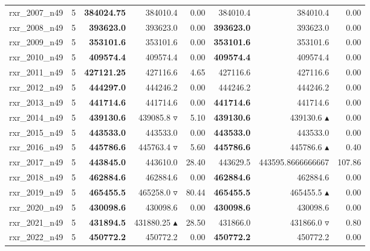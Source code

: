 \begin{table}[]
{\begin{tabular}{ll@{\hspace{1.2cm}}rrr@{\hspace{1.2cm}}rrr}
rxr_2007_n49 & 5 & \textbf{384024.75} & 384010.4 \phantom{$\blacktriangle$} & 0.00 & 384010.4 & 384010.4 \phantom{$\blacktriangle$} & 0.00 \\
rxr_2008_n49 & 5 & \textbf{393623.0} & 393623.0 \phantom{$\blacktriangle$} & 0.00 & \textbf{393623.0} & 393623.0 \phantom{$\blacktriangle$} & 0.00 \\
rxr_2009_n49 & 5 & \textbf{353101.6} & 353101.6 \phantom{$\blacktriangle$} & 0.00 & \textbf{353101.6} & 353101.6 \phantom{$\blacktriangle$} & 0.00 \\
rxr_2010_n49 & 5 & \textbf{409574.4} & 409574.4 \phantom{$\blacktriangle$} & 0.00 & \textbf{409574.4} & 409574.4 \phantom{$\blacktriangle$} & 0.00 \\
rxr_2011_n49 & 5 & \textbf{427121.25} & 427116.6 \phantom{$\blacktriangle$} & 4.65 & 427116.6 & 427116.6 \phantom{$\blacktriangle$} & 0.00 \\
rxr_2012_n49 & 5 & \textbf{444297.0} & 444246.2 \phantom{$\blacktriangle$} & 0.00 & 444246.2 & 444246.2 \phantom{$\blacktriangle$} & 0.00 \\
rxr_2013_n49 & 5 & \textbf{441714.6} & 441714.6 \phantom{$\blacktriangle$} & 0.00 & \textbf{441714.6} & 441714.6 \phantom{$\blacktriangle$} & 0.00 \\
rxr_2014_n49 & 5 & \textbf{439130.6} & 439085.8 $\triangledown$ & 5.10 & \textbf{439130.6} & 439130.6 $\blacktriangle$ & 0.00 \\
rxr_2015_n49 & 5 & \textbf{443533.0} & 443533.0 \phantom{$\blacktriangle$} & 0.00 & \textbf{443533.0} & 443533.0 \phantom{$\blacktriangle$} & 0.00 \\
rxr_2016_n49 & 5 & \textbf{445786.6} & 445763.4 $\triangledown$ & 5.60 & \textbf{445786.6} & 445786.6 $\blacktriangle$ & 0.40 \\
rxr_2017_n49 & 5 & \textbf{443845.0} & 443610.0 \phantom{$\blacktriangle$} & 28.40 & 443629.5 & 443595.8666666667 \phantom{$\blacktriangle$} & 107.86 \\
rxr_2018_n49 & 5 & \textbf{462884.6} & 462884.6 \phantom{$\blacktriangle$} & 0.00 & \textbf{462884.6} & 462884.6 \phantom{$\blacktriangle$} & 0.00 \\
rxr_2019_n49 & 5 & \textbf{465455.5} & 465258.0 $\triangledown$ & 80.44 & \textbf{465455.5} & 465455.5 $\blacktriangle$ & 0.00 \\
rxr_2020_n49 & 5 & \textbf{430098.6} & 430098.6 \phantom{$\blacktriangle$} & 0.00 & \textbf{430098.6} & 430098.6 \phantom{$\blacktriangle$} & 0.00 \\
rxr_2021_n49 & 5 & \textbf{431894.5} & 431880.25 $\blacktriangle$ & 28.50 & 431866.0 & 431866.0 $\triangledown$ & 0.80 \\
rxr_2022_n49 & 5 & \textbf{450772.2} & 450772.2 \phantom{$\blacktriangle$} & 0.00 & \textbf{450772.2} & 450772.2 \phantom{$\blacktriangle$} & 0.00 \\
\bottomrule
    \end{tabular}
    }
\end{table}
